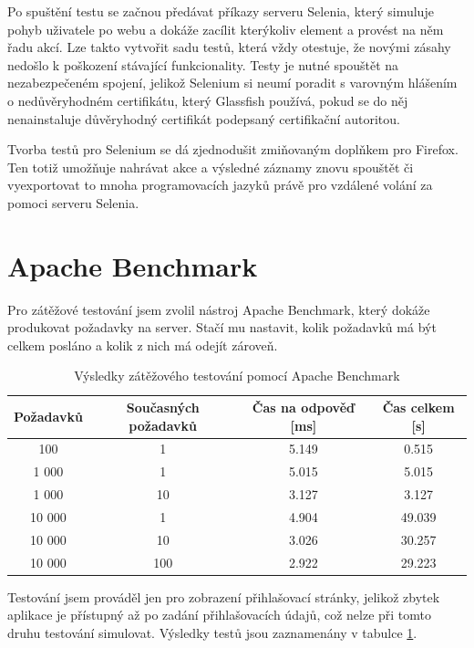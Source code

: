\documentclass[11pt,twoside,a4paper]{book}
\begin{document}
Po spuštění testu se začnou předávat příkazy serveru Selenia, který simuluje pohyb uživatele po webu a dokáže zacílit kterýkoliv element a provést na něm řadu akcí. Lze takto vytvořit sadu testů, která vždy otestuje, že novými zásahy nedošlo k poškození stávající funkcionality. Testy je nutné spouštět na nezabezpečeném spojení, jelikož Selenium si neumí poradit s varovným hlášením o nedůvěryhodném certifikátu, který Glassfish používá, pokud se do něj nenainstaluje důvěryhodný certifikát podepsaný certifikační autoritou.

Tvorba testů pro Selenium se dá zjednodušit zmiňovaným doplňkem pro Firefox. Ten totiž umožňuje nahrávat akce a výsledné záznamy znovu spouštět či vyexportovat to mnoha programovacích jazyků právě pro vzdálené volání za pomoci serveru Selenia.

\section{Apache Benchmark}

Pro zátěžové testování jsem zvolil nástroj Apache Benchmark, který dokáže produkovat požadavky na server. Stačí mu nastavit, kolik požadavků má být celkem posláno a kolik z nich má odejít zároveň.

\begin{table}[!t]
	\begin{center}
		\begin{tabular}[b]{|c|c|c|c|}
		\hline
		Požadavků & Současných požadavků & Čas na odpověď [ms] & Čas celkem [s] \\
		\hline		
		100 & 1 &  5.149 &  0.515 \\
		\hline
		1 000 & 1 & 5.015 & 5.015 \\
		\hline
		1 000 & 10 & 3.127 & 3.127 \\
		\hline
		10 000 & 1 & 4.904 & 49.039 \\
		\hline
		10 000 & 10 & 3.026 & 30.257 \\
		\hline
		10 000 & 100 & 2.922 & 29.223 \\
		\hline
		\end{tabular}
	\end{center}
	\caption{Výsledky zátěžového testování pomocí Apache Benchmark}
	\label{tab:zatezove_testovani}
\end{table}

Testování jsem prováděl jen pro zobrazení přihlašovací stránky, jelikož zbytek aplikace je přístupný až po zadání přihlašovacích údajů, což nelze při tomto druhu testování simulovat. Výsledky testů jsou zaznamenány v tabulce \ref{tab:zatezove_testovani}. 
\end{document}
